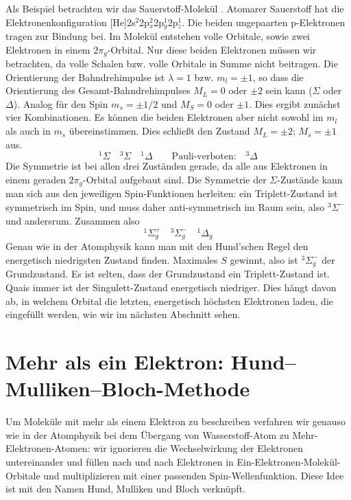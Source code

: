 Als Beispiel betrachten wir das Sauerstoff-Molekül . Atomarer Sauerstoff hat die Elektronenkonfiguration [He]2s$^2$2p$_x^2$2p$_y^1$2p$_z^1$. Die beiden ungepaarten p-Elektronen tragen zur Bindung bei. Im Molekül entstehen volle Orbitale, sowie zwei Elektronen in einem $2\pi_g$-Orbital. Nur diese beiden Elektronen müssen wir betrachten, da volle Schalen bzw. volle Orbitale in Summe nicht beitragen. Die Orientierung der  Bahndrehimpulse ist  $\lambda = 1$ bzw. $m_l = \pm 1$, so dass die Orientierung des Gesamt-Bahndrehimpulses $M_L = 0$ oder $\pm 2$ sein kann ($\Sigma$ oder $\Delta$). Analog für den Spin $m_s = \pm 1/2$ und $M_S = 0 $ oder $\pm 1$. Dies ergibt zunächst  vier  Kombinationen. Es können die beiden Elektronen aber nicht sowohl im $m_l$ als auch in $m_s$ übereinstimmen. Dies schließt den Zustand $M_L = \pm 2$; $M_s = \pm 1$ aus.
\begin{equation}
 ^1\Sigma \quad ^3\Sigma \quad ^1\Delta \qquad \text{Pauli-verboten:} \quad ^3\Delta  
\end{equation}
Die Symmetrie ist bei allen drei Zuständen gerade, da alle aus  Elektronen in einem geraden $2\pi_g$-Orbital aufgebaut sind. Die Symmetrie der $\Sigma$-Zustände kann man sich aus den jeweiligen Spin-Funktionen herleiten: ein Triplett-Zustand ist symmetrisch im Spin, und muss daher anti-symmetrisch im Raum sein, also $^3\Sigma^-$ und andersrum. Zusammen also
\begin{equation}
 ^1\Sigma_g^+ \quad ^3\Sigma_g^- \quad ^1\Delta _g
\end{equation}
Genau wie in der Atomphysik kann man mit den Hund'schen Regel den energetisch niedrigsten Zustand finden. Maximales $S$ gewinnt, also ist $^3\Sigma_g^- $ der Grundzustand. Es ist selten, dass der Grundzustand ein Triplett-Zustand ist. Quais immer ist der Singulett-Zustand energetisch niedriger. Dies hängt davon ab, in welchem Orbital die letzten, energetisch höchsten Elektronen laden, die eingefüllt werden, wie wir im nächsten Abschnitt sehen.





\section{Mehr als ein Elektron: Hund--Mulliken--Bloch-Methode }

Um Moleküle mit mehr als einem Elektron zu beschreiben verfahren wir genauso wie in der Atomphysik bei dem Übergang von Wasserstoff-Atom zu Mehr-Elektronen-Atomen: wir ignorieren die Wechselwirkung der Elektronen untereinander und füllen nach und nach Elektronen in Ein-Elektronen-Molekül-Orbitale und multiplizieren mit einer passenden Spin-Wellenfunktion. Diese Idee ist mit den Namen Hund, Mulliken und Bloch verknüpft.


